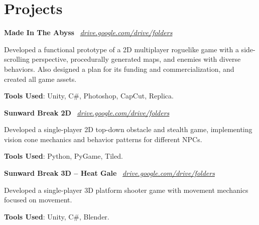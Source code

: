 \section{Projects}

\begin{onecolentry}
\textbf{Made In The Abyss} \
\textit{\href{https://drive.google.com/drive/folders/1yEjoHvc1qDIjDSd7rOD395CgNGLbrMai?usp=drive_link}{drive.google.com/drive/folders}}

\end{onecolentry}

\vspace{0.20 cm}
\begin{onecolentry}
\begin{highlights}
\item Developed a functional prototype of a 2D multiplayer roguelike game with a side-scrolling perspective, procedurally generated maps, and enemies with diverse behaviors. Also designed a plan for its funding and commercialization, and created all game assets.
\item \textbf{Tools Used}: Unity, C\#, Photoshop, CapCut, Replica.
\end{highlights}
\end{onecolentry}

\vspace{0.2 cm}

\begin{onecolentry}
\textbf{Sunward Break 2D} \
\textit{\href{https://drive.google.com/drive/folders/1sLz1S1gJQGhMduDUw5MLdOKH04oDLoP2?usp=sharing}{drive.google.com/drive/folders}}

\end{onecolentry}

\vspace{0.20 cm}
\begin{onecolentry}
\begin{highlights}
\item Developed a single-player 2D top-down obstacle and stealth game, implementing vision cone mechanics and behavior patterns for different NPCs.
\item \textbf{Tools Used}: Python, PyGame, Tiled.
\end{highlights}
\end{onecolentry}

\vspace{0.2 cm}

\begin{onecolentry}
\textbf{Sunward Break 3D – Heat Gale} \
\textit{\href{https://drive.google.com/drive/folders/1qxCw2BFty3NAGFAy8rxgdD7cgBjDTLI4?usp=sharing}{drive.google.com/drive/folders}}

\end{onecolentry}

\vspace{0.20 cm}
\begin{onecolentry}
\begin{highlights}
\item Developed a single-player 3D platform shooter game with movement mechanics focused on movement.
\item \textbf{Tools Used}: Unity, C\#, Blender.
\end{highlights}
\end{onecolentry}